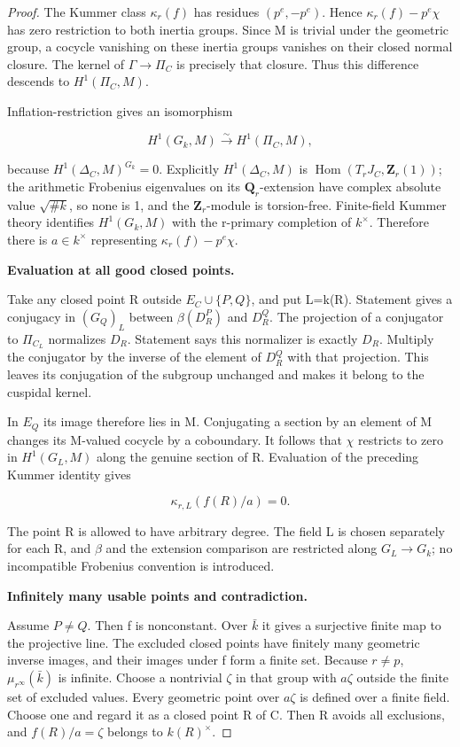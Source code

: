 \begin{proof}
The Kummer class \({\kappa}_r(f)\) has residues \((p^e,-p^e)\). Hence \({\kappa}_r(f)-p^e{\chi}\) has zero restriction to both inertia groups. Since M is trivial under the geometric group, a cocycle vanishing on these inertia groups vanishes on their closed normal closure. The kernel of \({\Gamma}{\to}{\Pi}_C\) is precisely that closure. Thus this difference descends to \(H^1({\Pi}_C,M)\).

Inflation-restriction gives an isomorphism

\[H^1(G_k,M)\xrightarrow\sim H^1(\Pi_C,M),\]

because \(H^1(\Delta_C,M)^{G_k}=0\). Explicitly \(H^1(\Delta_C,M)\) is \(\operatorname{Hom}(T_rJ_C,\mathbf{Z}_r(1))\); the arithmetic Frobenius eigenvalues on its \(\mathbf{Q}_r\)-extension have complex absolute value \(\sqrt{\#k}\), so none is 1, and the \(\mathbf{Z}_r\)-module is torsion-free. Finite-field Kummer theory identifies \(H^1(G_k,M)\) with the r-primary completion of \(k^{\times}\). Therefore there is \(a{\in}k^{\times}\) representing \({\kappa}_r(f)-p^e{\chi}\).

\textbf{Evaluation at all good closed points.}

Take any closed point R outside \(E_C{\cup}\{P,Q\}\), and put L=k(R). Statement  gives a conjugacy in \((G_Q)_L\) between \({\beta}(D_R^P)\) and \(D_R^Q\). The projection of a conjugator to \({\Pi}_{C_L}\) normalizes \(D_R\). Statement  says this normalizer is exactly \(D_R\). Multiply the conjugator by the inverse of the element of \(D_R^Q\) with that projection. This leaves its conjugation of the subgroup unchanged and makes it belong to the cuspidal kernel.

In \(E_Q\) its image therefore lies in M. Conjugating a section by an element of M changes its M-valued cocycle by a coboundary. It follows that \({\chi}\) restricts to zero in \(H^1(G_L,M)\) along the genuine section of R. Evaluation of the preceding Kummer identity gives

\[\kappa_{r,L}(f(R)/a)=0.\]

The point R is allowed to have arbitrary degree. The field L is chosen separately for each R, and \({\beta}\) and the extension comparison are restricted along \(G_L{\to}G_k\); no incompatible Frobenius convention is introduced.

\textbf{Infinitely many usable points and contradiction.}

Assume \(P{\ne}Q\). Then f is nonconstant. Over \(\bar k\) it gives a surjective finite map to the projective line. The excluded closed points have finitely many geometric inverse images, and their images under f form a finite set. Because \(r{\ne}p\), \(\mu_{r^\infty}(\bar k)\) is infinite. Choose a nontrivial \({\zeta}\) in that group with \(a{\zeta}\) outside the finite set of excluded values. Every geometric point over \(a{\zeta}\) is defined over a finite field. Choose one and regard it as a closed point R of C. Then R avoids all exclusions, and \(f(R)/a={\zeta}\) belongs to \(k(R)^{\times}\).


\end{proof}
